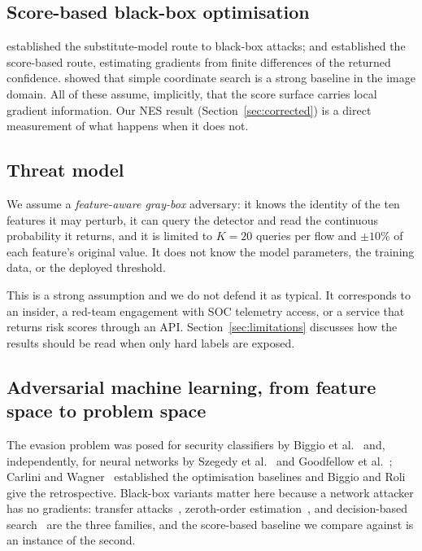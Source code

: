 \documentclass[journal]{IEEEtran}
\providecommand{\citep}[1]{\cite{#1}}
\providecommand{\citet}[1]{\cite{#1}}
\theoremstyle{definition}
\newcommand{\Kbudget}{20}
\newcommand{\budgetpct}{10}
\begin{document}
\subsection{Score-based black-box optimisation}
\citet{papernot2017practical} established the substitute-model route to
black-box attacks; \citet{ilyas2018nes} and \citet{chen2017zoo} established the
score-based route, estimating gradients from finite differences of the returned
confidence. \citet{guo2019simba} showed that simple coordinate search is a
strong baseline in the image domain. All of these assume, implicitly, that the
score surface carries local gradient information. Our NES result
(Section~\ref{sec:corrected}) is a direct measurement of what happens when it
does not.

\subsection{Threat model}
\label{sec:threat}
We assume a \emph{feature-aware gray-box} adversary: it knows the identity of
the ten features it may perturb, it can query the detector and read the
continuous probability it returns, and it is limited to $K=\Kbudget$ queries per
flow and $\pm\budgetpct$\% of each feature's original value. It does not know the
model parameters, the training data, or the deployed threshold.

This is a strong assumption and we do not defend it as typical. It corresponds
to an insider, a red-team engagement with SOC telemetry access, or a service
that returns risk scores through an API. Section~\ref{sec:limitations} discusses
how the results should be read when only hard labels are exposed.


\subsection{Adversarial machine learning, from feature space to problem space}

The evasion problem was posed for security classifiers by
Biggio et al.~\citep{biggio2013evasion} and, independently, for neural networks by
Szegedy et al.~\citep{szegedy2014intriguing} and Goodfellow et
al.~\citep{goodfellow2015explaining}; Carlini and
Wagner~\citep{carlini2017towards} established the optimisation baselines and
Biggio and Roli~\citep{biggio2018wild} give the retrospective. Black-box variants
matter here because a network attacker has no gradients: transfer
attacks~\citep{papernot2017practical}, zeroth-order
estimation~\citep{chen2017zoo}, and decision-based
search~\citep{brendel2018decision} are the three families, and the score-based
baseline we compare against is an instance of the second.
\end{document}
